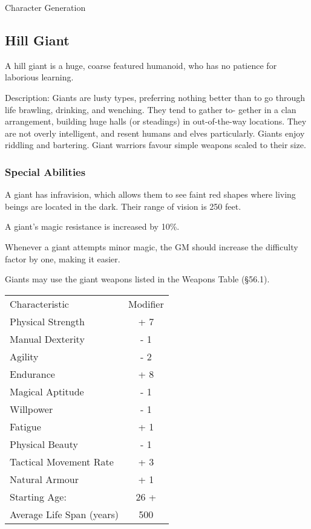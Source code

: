 \begin{Chapter}{Character Generation}
\subsection{Hill Giant}

A hill giant is a huge, coarse featured humanoid, who has no patience
for laborious learning.

Description: Giants are lusty types, preferring nothing better than to
go through life brawling, drinking, and wenching.  They tend to gather
to- gether in a clan arrangement, building huge halls (or steadings)
in out-of-the-way locations. They are not overly intelligent, and
resent humans and elves particularly.  Giants enjoy riddling and
bartering.  Giant warriors favour simple weapons scaled to their size.

\subsubsection{Special Abilities}

\begin{Enumerate}
  
\item A giant has infravision, which allows them to see faint red
  shapes where living beings are located in the dark. Their range of
  vision is 250 feet.

\item A giant’s magic resistance is increased by 10\%. 

\item Whenever a giant attempts minor magic, the GM should increase
  the difficulty factor by one, making it easier.

\item Giants may use the giant weapons listed in the Weapons Table
  (§56.1).

\end{Enumerate}

\begin{tabularx}{\columnwidth}{Xc}
Characteristic			& Modifier \\
Physical Strength		& + 7 \\
Manual Dexterity		& - 1 \\
Agility				& - 2 \\
Endurance			& + 8 \\
Magical Aptitude		& - 1 \\
Willpower			& - 1 \\
Fatigue				& + 1 \\
Physical Beauty			& - 1 \\
Tactical Movement Rate		& + 3 \\
Natural Armour			& + 1 \\
Starting Age:			& 26 + \\
Average Life Span (years)	& 500 \\
\end{tabularx}


\end{Chapter}
